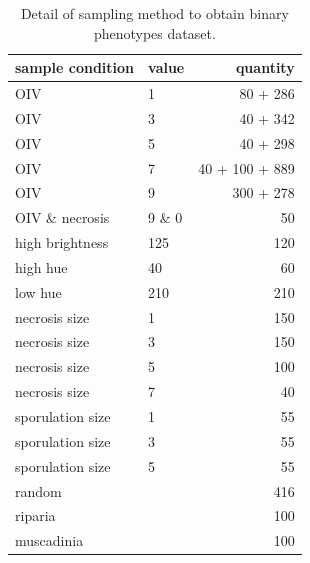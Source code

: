 \documentclass[english]{article}
\begin{document}
\begin{table}[H]
    \centering
    \caption{Detail of sampling method to obtain binary phenotypes dataset.}
    \label{tab:binsample}
    \begin{tabular}{llr}
        \toprule
        sample condition & value  & quantity \\
        \midrule
        OIV              & 1      & 80 + 286       \\
        OIV              & 3      & 40 + 342      \\
        OIV              & 5      & 40 + 298     \\
        OIV              & 7      & 40 + 100 + 889   \\
        OIV              & 9      & 300 + 278     \\
        OIV \& necrosis  & 9 \& 0 & 50       \\
        high brightness  & 125    & 120      \\
        high hue         & 40     & 60       \\
        low hue          & 210    & 210      \\
        necrosis size    & 1      & 150      \\
        necrosis size    & 3      & 150      \\
        necrosis size    & 5      & 100      \\
        necrosis size    & 7      & 40       \\
        sporulation size & 1      & 55       \\
        sporulation size & 3      & 55       \\
        sporulation size & 5      & 55       \\
        random           &        & 416      \\
        riparia          &        & 100      \\
        muscadinia       &        & 100      \\   
        \bottomrule
    \end{tabular}
\end{table}
\end{document}
